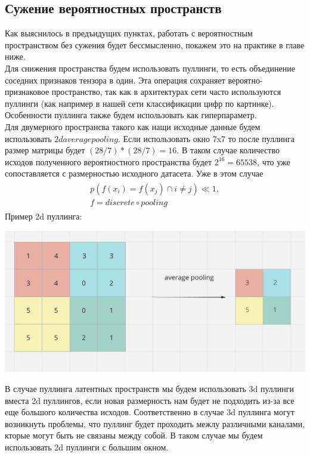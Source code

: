 \subsection{Сужение вероятностных пространств}
Как выяснилось в предъидущих пунктах, работать с вероятностным пространством без сужения будет бессмысленно, покажем это на практике в главе ниже. \\
Для снижения пространства будем использовать пуллинги, то есть объединение соседних признаков тензора в один. Эта операция сохраняет вероятно-признаковое пространство, так как в архитектурах сети часто используются пуллинги (как например в нашей сети классификации цифр по картинке). Особенности пуллинга также будем использовать как гиперпараметр. \\
Для двумерного пространсва такого как нащи исходные данные будем использовать $2d average pooling$. Если использовать окно 7x7 то после 
пуллинга размер матрицы будет $(28 / 7) * (28 / 7) = 16$. В таком случае количество исходов полученного вероятностного пространства будет $2^{16} = 65538$, что уже сопоставляется с размерностью исходного датасета. Уже в этом случае 
\begin{gather}
\begin{aligned}  
p(f(x_i) = f(x_j) \cap i \neq j) \ll 1, \\
f = discrete \circ pooling 
\end{aligned}
\end{gather}
Пример 2d пуллинга:
\begin{center}
    \includegraphics[scale=0.3]{images/2d_pooling.png}
\end{center}
В случае пуллинга латентных пространств мы будем использовать 3d пуллинги вместа 2d пуллингов, если новая размерность нам будет не подходить из-за все еще большого количества исходов. Соответственно в случае 3d пуллинга могут возникнуть проблемы, что пуллинг будет проходить межлу различными каналами, кторые могут быть не связаны между собой. В таком случае мы будем использовать 2d пуллинги с большим окном. \\
